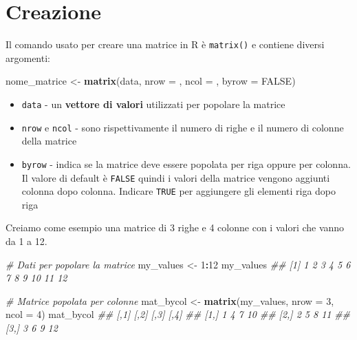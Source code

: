 \documentclass[
]{book}
\newenvironment{Shaded}{\begin{snugshade}}{\end{snugshade}}
\newcommand{\CommentTok}[1]{\textcolor[rgb]{0.56,0.35,0.01}{\textit{#1}}}
\newcommand{\DataTypeTok}[1]{\textcolor[rgb]{0.13,0.29,0.53}{#1}}
\newcommand{\DecValTok}[1]{\textcolor[rgb]{0.00,0.00,0.81}{#1}}
\newcommand{\KeywordTok}[1]{\textcolor[rgb]{0.13,0.29,0.53}{\textbf{#1}}}
\newcommand{\NormalTok}[1]{#1}
\newcommand{\OperatorTok}[1]{\textcolor[rgb]{0.81,0.36,0.00}{\textbf{#1}}}
\newcommand{\OtherTok}[1]{\textcolor[rgb]{0.56,0.35,0.01}{#1}}
\newcommand{\StringTok}[1]{\textcolor[rgb]{0.31,0.60,0.02}{#1}}
\providecommand{\tightlist}{%
  \setlength{\itemsep}{0pt}\setlength{\parskip}{0pt}}
\begin{document}
\hypertarget{creazione-1}{%
\section{Creazione}\label{creazione-1}}

Il comando usato per creare una matrice in R è \texttt{matrix()} e contiene diversi argomenti:

\begin{Shaded}
\begin{Highlighting}[]
\NormalTok{nome_matrice <-}\StringTok{ }\KeywordTok{matrix}\NormalTok{(data, }\DataTypeTok{nrow =}\NormalTok{ , }\DataTypeTok{ncol =}\NormalTok{ , }\DataTypeTok{byrow =} \OtherTok{FALSE}\NormalTok{)}
\end{Highlighting}
\end{Shaded}

\begin{itemize}
\tightlist
\item
  \texttt{data} - un \textbf{vettore di valori} utilizzati per popolare la matrice
\item
  \texttt{nrow} e \texttt{ncol} - sono rispettivamente il numero di righe e il numero di colonne della matrice
\item
  \texttt{byrow} - indica se la matrice deve essere popolata per riga oppure per colonna. Il valore di default è \texttt{FALSE} quindi i valori della matrice vengono aggiunti colonna dopo colonna. Indicare \texttt{TRUE} per aggiungere gli elementi riga dopo riga
\end{itemize}

Creiamo come esempio una matrice di 3 righe e 4 colonne con i valori che vanno da 1 a 12.

\begin{Shaded}
\begin{Highlighting}[]
\CommentTok{# Dati per popolare la matrice}
\NormalTok{my_values <-}\StringTok{ }\DecValTok{1}\OperatorTok{:}\DecValTok{12}
\NormalTok{my_values}
\CommentTok{##  [1]  1  2  3  4  5  6  7  8  9 10 11 12}

\CommentTok{# Matrice popolata per colonne}
\NormalTok{mat_bycol <-}\StringTok{ }\KeywordTok{matrix}\NormalTok{(my_values, }\DataTypeTok{nrow =} \DecValTok{3}\NormalTok{, }\DataTypeTok{ncol =} \DecValTok{4}\NormalTok{)}
\NormalTok{mat_bycol}
\CommentTok{##      [,1] [,2] [,3] [,4]}
\CommentTok{## [1,]    1    4    7   10}
\CommentTok{## [2,]    2    5    8   11}
\CommentTok{## [3,]    3    6    9   12}
\end{Highlighting}
\end{Shaded}
\end{document}
